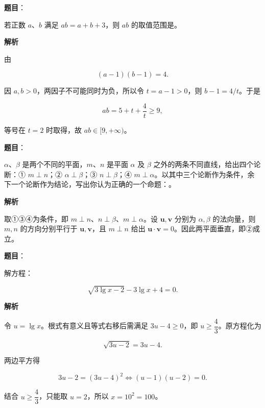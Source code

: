 \begin{answer}

\textbf{题目}：

若正数 $a$、$b$ 满足 $ab=a+b+3$，则 $ab$ 的取值范围是\gkblank{}。

\textbf{解析}

由

\nopagebreak[4]
\[
(a-1)(b-1)=4.
\]

因 $a,b>0$，两因子不可能同时为负，所以令 $t=a-1>0$，则 $b-1=4/t$。于是

\nopagebreak[4]
\[
ab=5+t+\frac4t\ge9,
\]

等号在 $t=2$ 时取得，故 $ab\in[9,+\infty)$。

\gkanswer{答案：$[9,+\infty)$}

\end{answer}
\begin{answer}

\textbf{题目}：

$\alpha$、$\beta$ 是两个不同的平面，$m$、$n$ 是平面 $\alpha$ 及 $\beta$ 之外的两条不同直线，给出四个论断：① $m\perp n$；② $\alpha\perp\beta$；③ $n\perp\beta$；④ $m\perp\alpha$。以其中三个论断作为条件，余下一个论断作为结论，写出你认为正确的一个命题：\gkblank{}。

\textbf{解析}

取①③④为条件，即 $m\perp n$、$n\perp\beta$、$m\perp\alpha$。设 $\mathbf u,\mathbf v$ 分别为 $\alpha,\beta$ 的法向量，则 $m,n$ 的方向分别平行于 $\mathbf u,\mathbf v$，且 $m\perp n$ 给出 $\mathbf u\cdot\mathbf v=0$。因此两平面垂直，即②成立。


\end{answer}
\begin{answer}

\textbf{题目}：

解方程：

\nopagebreak[4]
\[
\sqrt{3\lg x-2}-3\lg x+4=0.
\]

\textbf{解析}

令 $u=\lg x$。根式有意义且等式右移后需满足 $3u-4\ge0$，即 $u\ge\dfrac43$。原方程化为

\nopagebreak[4]
\[
\sqrt{3u-2}=3u-4.
\]

两边平方得

\nopagebreak[4]
\[
3u-2=(3u-4)^2
\Longleftrightarrow
(u-1)(u-2)=0.
\]

结合 $u\ge\dfrac43$，只能取 $u=2$，所以 $x=10^2=100$。


\end{answer}
